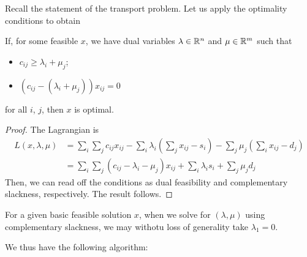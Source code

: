 \documentclass{../../template/note}
\begin{document}
    Recall the statement of the transport problem. Let us apply the optimality conditions to obtain

    \begin{theorem}
        If, for some feasible $x$, we have dual variables $\lambda \in \mathbb R^n$ and $\mu \in \mathbb R^m$ such that
        \begin{itemize}
            \item $c_{ij} \geq \lambda_i + \mu_j$;
            \item $\left(c_{ij}-(\lambda_i+\mu_j)\right)x_{ij} = 0$
        \end{itemize}
        for all $i$, $j$, then $x$ is optimal.
    \end{theorem}
    
    \begin{proof}
        The Lagrangian is
        \begin{align*}
            L(x, \lambda, \mu) &= \sum_i \sum_j c_{ij}x_{ij} - \sum_i \lambda_i\left(\sum_j x_{ij}-s_i\right) - \sum_j \mu_j \left(\sum_i x_{ij} - d_j\right) \\
            &= \sum_i \sum_j \left(c_{ij}-\lambda_i-\mu_j\right)x_{ij} + \sum_i \lambda_i s_i + \sum_j \mu_j d_j
        \end{align*}
        Then, we can read off the conditions as dual feasibility and complementary slackness, respectively. The result follows.        
    \end{proof}
    
    \begin{remark*}
        For a given basic feasible solution $x$, when we solve for $(\lambda, \mu)$ using complementary slackness, we may withotu loss of generality take $\lambda_1 = 0$.
    \end{remark*}
    
    We thus have the following algorithm:
    
\end{document}
